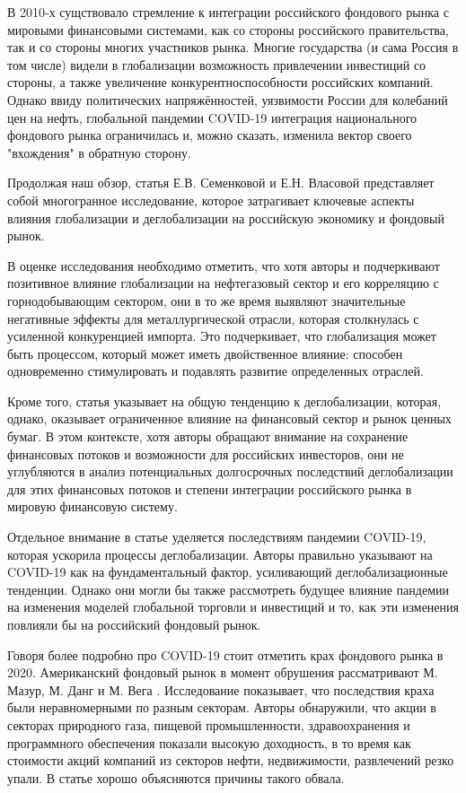 \documentclass[14pt]{extarticle}
\begin{document}
В 2010-х сущствовало стремление к интеграции российского фондового рынка с мировыми финансовыми системами, как со стороны российского правительства, так и со стороны многих участников рынка. Многие государства (и сама Россия в том числе) видели в глобализации возможность привлечении инвестиций со стороны, а также увеличение конкурентноспособности российских компаний. Однако ввиду политических напряжённостей, уязвимости России для колебаний цен на нефть, глобальной пандемии COVID-19 интеграция национального фондового рынка ограничилась и, можно сказать, изменила вектор своего "вхождения" в обратную сторону.

Продолжая наш обзор, статья Е.В. Семенковой и Е.Н. Власовой \cite{2} представляет собой многогранное исследование, которое затрагивает ключевые аспекты влияния глобализации и деглобализации на российскую экономику и фондовый рынок.

В оценке исследования необходимо отметить, что хотя авторы и подчеркивают позитивное влияние глобализации на нефтегазовый сектор и его корреляцию с горнодобывающим сектором, они в то же время выявляют значительные негативные эффекты для металлургической отрасли, которая столкнулась с усиленной конкуренцией импорта. Это подчеркивает, что глобализация может быть процессом, который может иметь двойственное влияние: способен одновременно стимулировать и подавлять развитие определенных отраслей.

Кроме того, статья указывает на общую тенденцию к деглобализации, которая, однако, оказывает ограниченное влияние на финансовый сектор и рынок ценных бумаг. В этом контексте, хотя авторы обращают внимание на сохранение финансовых потоков и возможности для российских инвесторов, они не углубляются в анализ потенциальных долгосрочных последствий деглобализации для этих финансовых потоков и степени интеграции российского рынка в мировую финансовую систему.

Отдельное внимание в статье уделяется последствиям пандемии COVID-19, которая ускорила процессы деглобализации. Авторы правильно указывают на COVID-19 как на фундаментальный фактор, усиливающий деглобализационные тенденции. Однако они могли бы также рассмотреть будущее влияние пандемии на изменения моделей глобальной торговли и инвестиций и то, как эти изменения повлияли бы на российский фондовый рынок.

Говоря более подробно про COVID-19 стоит отметить крах фондового рынка в 2020. Американский фондовый рынок в момент обрушения рассматривают М. Мазур, М. Данг и М. Вега \cite{MAZUR2021101690}.
Исследование показывает, что последствия краха были неравномерными по разным секторам. Авторы обнаружили, что акции в секторах природного газа, пищевой промышленности, здравоохранения и программного обеспечения показали высокую доходность, в то время как стоимости акций компаний из секторов нефти, недвижимости, развлечений резко упали. В статье хорошо объясняются причины такого обвала.
\end{document}

